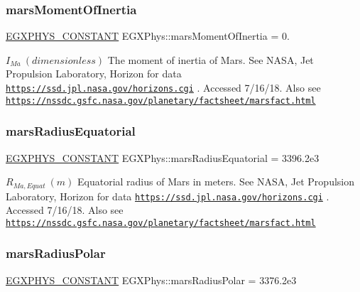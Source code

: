 \subsubsection{\texorpdfstring{mars\+Moment\+Of\+Inertia}{marsMomentOfInertia}}
{\footnotesize\ttfamily \mbox{\hyperlink{group___e_g_x_phys-_constants-_macros_ga76980d288494ce1714c9ac68a95ba702}{E\+G\+X\+P\+H\+Y\+S\+\_\+\+C\+O\+N\+S\+T\+A\+NT}} E\+G\+X\+Phys\+::mars\+Moment\+Of\+Inertia = 0.}

$ I_{Ma} \ (dimensionless)$ The moment of inertia of Mars. See N\+A\+SA, Jet Propulsion Laboratory, Horizon for data \href{https://ssd.jpl.nasa.gov/horizons.cgi}{\tt https\+://ssd.\+jpl.\+nasa.\+gov/horizons.\+cgi} . Accessed 7/16/18. Also see \href{https://nssdc.gsfc.nasa.gov/planetary/factsheet/marsfact.html}{\tt https\+://nssdc.\+gsfc.\+nasa.\+gov/planetary/factsheet/marsfact.\+html} \mbox{\label{group___e_g_x_phys-_constants-_astrophysics-_solar_system-_mars-_bulk_gad164808b78372ba39b4e1db1daa53a61}} 
\subsubsection{\texorpdfstring{mars\+Radius\+Equatorial}{marsRadiusEquatorial}}
{\footnotesize\ttfamily \mbox{\hyperlink{group___e_g_x_phys-_constants-_macros_ga76980d288494ce1714c9ac68a95ba702}{E\+G\+X\+P\+H\+Y\+S\+\_\+\+C\+O\+N\+S\+T\+A\+NT}} E\+G\+X\+Phys\+::mars\+Radius\+Equatorial = 3396.\+2e3}

$R_{Ma,Equat} \ (m)$ Equatorial radius of Mars in meters. See N\+A\+SA, Jet Propulsion Laboratory, Horizon for data \href{https://ssd.jpl.nasa.gov/horizons.cgi}{\tt https\+://ssd.\+jpl.\+nasa.\+gov/horizons.\+cgi} . Accessed 7/16/18. Also see \href{https://nssdc.gsfc.nasa.gov/planetary/factsheet/marsfact.html}{\tt https\+://nssdc.\+gsfc.\+nasa.\+gov/planetary/factsheet/marsfact.\+html} \mbox{\label{group___e_g_x_phys-_constants-_astrophysics-_solar_system-_mars-_bulk_ga9babf4f526022d2bcd3d434453401ff5}} 
\subsubsection{\texorpdfstring{mars\+Radius\+Polar}{marsRadiusPolar}}
{\footnotesize\ttfamily \mbox{\hyperlink{group___e_g_x_phys-_constants-_macros_ga76980d288494ce1714c9ac68a95ba702}{E\+G\+X\+P\+H\+Y\+S\+\_\+\+C\+O\+N\+S\+T\+A\+NT}} E\+G\+X\+Phys\+::mars\+Radius\+Polar = 3376.\+2e3}

